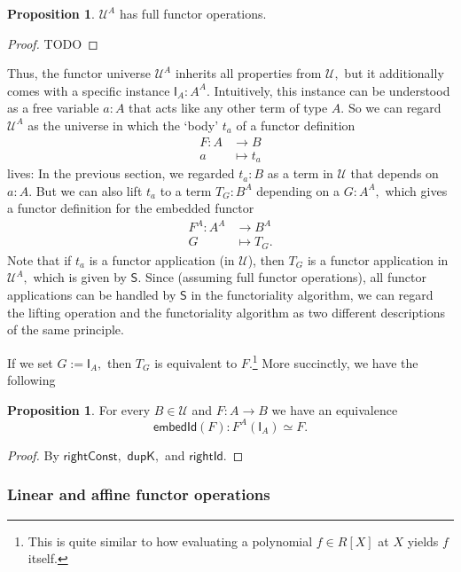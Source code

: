 \documentclass[a4paper]{article}
\theoremstyle{definition}
\newtheorem{proposition}[definition]{Proposition}
\theoremstyle{remark}
\renewcommand{\equiv}{\simeq}
\newcommand{\U}{\mathcal{U}}
\newcommand{\nm}{\mathsf}
\newcommand{\combinator}{\nm}
\newcommand{\idFun}{\combinator{I}}
\newcommand{\revSubstFun}{\combinator{S}}
\begin{document}
\begin{proposition}
  $\U^A$ has full functor operations. 
\end{proposition}
\vspace{-1ex}
\begin{proof}
  TODO
\end{proof}

Thus, the functor universe $\U^A$ inherits all properties from $\U,$ but it
additionally comes with a specific instance $\idFun_A : A^A.$ Intuitively, this
instance can be understood as a free variable $a : A$ that acts like any other term
of type $A.$ So we can regard $\U^A$ as the universe in which the `body' $t_a$ of a
functor definition
\begin{align*}
  F : A &\to     B\\
      a &\mapsto t_a
\end{align*}
lives:
In the previous section, we regarded $t_a : B$ as a term in $\U$ that depends on
$a : A.$ But we can also lift $t_a$ to a term $T_G : B^A$ depending on a $G : A^A,$
which gives a functor definition for the embedded functor
\begin{align*}
  F^A : A^A &\to     B^A\\
        G   &\mapsto T_G.
\end{align*}
Note that if $t_a$ is a functor application (in $\U$), then $T_G$ is a functor
application in $\U^A,$ which is given by $\revSubstFun.$ Since (assuming full functor
operations), all functor applications can be handled by $\revSubstFun$ in the
functoriality algorithm, we can regard the lifting operation and the functoriality
algorithm as two different descriptions of the same principle.

If we set $G := \idFun_A,$ then $T_G$ is equivalent to $F.$\footnote{This is quite
similar to how evaluating a polynomial $f \in R[X]$ at $X$ yields $f$ itself.}
More succinctly, we have the following

\begin{proposition}
  For every $B \in \U$ and $F : A \to B$ we have an equivalence
  \[\nm{embedId}(F) : F^A(\idFun_A) \equiv F.\]
\end{proposition}
\vspace{-2ex}
\begin{proof}
  By $\nm{rightConst},$ $\nm{dupK},$ and $\nm{rightId}.$
\end{proof}

\subsubsection*{Linear and affine functor operations}
\end{document}
